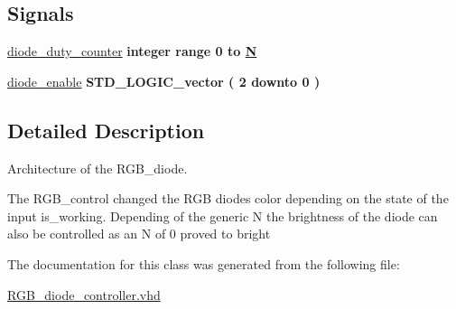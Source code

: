 \subsection*{Signals}
 \begin{DoxyCompactItemize}
\item 
\hypertarget{classRGB__diode__controller_1_1Behavioral_a36d6c358f271c34f9fba99138b3bddf2}{\hyperlink{classRGB__diode__controller_1_1Behavioral_a36d6c358f271c34f9fba99138b3bddf2}{diode\-\_\-duty\-\_\-counter} {\bfseries \textcolor{comment}{integer}\textcolor{vhdlchar}{ }\textcolor{vhdlkeyword}{range}\textcolor{vhdlchar}{ } \textcolor{vhdldigit}{0} \textcolor{vhdlchar}{ }\textcolor{vhdlchar}{ }\textcolor{vhdlchar}{ }\textcolor{vhdlkeyword}{to}\textcolor{vhdlchar}{ }\textcolor{vhdlchar}{ }\textcolor{vhdlchar}{ }{\bfseries \hyperlink{classRGB__diode__controller_ad3971b999c08c97da803416025fcebb0}{N}} \textcolor{vhdlchar}{ }} }\label{classRGB__diode__controller_1_1Behavioral_a36d6c358f271c34f9fba99138b3bddf2}

\item 
\hypertarget{classRGB__diode__controller_1_1Behavioral_a471ca34f0f3e1757f74b6c21eb6c97ed}{\hyperlink{classRGB__diode__controller_1_1Behavioral_a471ca34f0f3e1757f74b6c21eb6c97ed}{diode\-\_\-enable} {\bfseries \textcolor{comment}{S\-T\-D\-\_\-\-L\-O\-G\-I\-C\-\_\-vector}\textcolor{vhdlchar}{ }\textcolor{vhdlchar}{(}\textcolor{vhdlchar}{ }\textcolor{vhdlchar}{ } \textcolor{vhdldigit}{2} \textcolor{vhdlchar}{ }\textcolor{vhdlchar}{ }\textcolor{vhdlchar}{ }\textcolor{vhdlkeyword}{downto}\textcolor{vhdlchar}{ }\textcolor{vhdlchar}{ }\textcolor{vhdlchar}{ } \textcolor{vhdldigit}{0} \textcolor{vhdlchar}{ }\textcolor{vhdlchar}{)}\textcolor{vhdlchar}{ }} }\label{classRGB__diode__controller_1_1Behavioral_a471ca34f0f3e1757f74b6c21eb6c97ed}

\end{DoxyCompactItemize}


\subsection{Detailed Description}
Architecture of the R\-G\-B\-\_\-diode. 

The R\-G\-B\-\_\-control changed the R\-G\-B diodes color depending on the state of the input is\-\_\-working. Depending of the generic N the brightness of the diode can also be controlled as an N of 0 proved to bright 

The documentation for this class was generated from the following file\-:\begin{DoxyCompactItemize}
\item 
\hyperlink{RGB__diode__controller_8vhd}{R\-G\-B\-\_\-diode\-\_\-controller.\-vhd}\end{DoxyCompactItemize}
